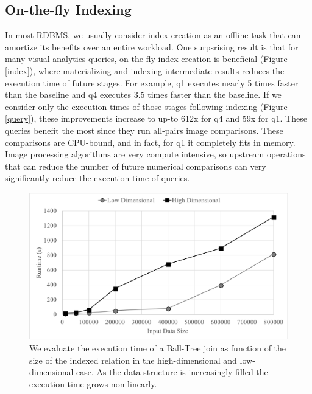 \subsection{On-the-fly Indexing}
In most RDBMS, we usually consider index creation as an offline task that can amortize its benefits over an entire workload.
One surpsrising result is that for many visual analytics queries, on-the-fly index creation is beneficial (Figure \ref{index}), where materializing and indexing intermediate results reduces the execution time of future stages.
For example, q1 executes nearly 5 times faster than the baseline and q4 executes 3.5 times faster than the baseline.
If we consider only the execution times of those stages following indexing (Figure \ref{query}), these improvements increase to up-to 612x for q4 and 59x for q1. 
These queries benefit the most since they run all-pairs image comparisons. 
These comparisons are CPU-bound, and in fact, for q1 it completely fits in memory.
Image processing algorithms are very compute intensive, so upstream operations that can reduce the number of future numerical comparisons can very significantly reduce the execution time of queries.

\begin{figure}[t]
\centering
 \includegraphics[width=\columnwidth]{figures/spatialjoin.png}
 \caption{We evaluate the execution time of a Ball-Tree join as function of the size of the indexed relation in the high-dimensional and low-dimensional case. As the data structure is increasingly filled the execution time grows non-linearly.   \label{join} }
\end{figure}

